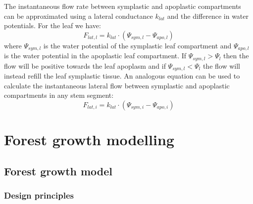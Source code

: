 \documentclass[]{book}
\begin{document}
The instantaneous flow rate between symplastic and apoplastic compartments can be approximated using a lateral conductance \(k_{lat}\) and the difference in water potentials. For the leaf we have:
\begin{equation}
F_{lat, l} = k_{lat} \cdot (\Psi_{sym, l} - \Psi_{apo,l})
\end{equation}
where \(\Psi_{sym, l}\) is the water potential of the symplastic leaf compartment and \(\Psi_{apo,l}\) is the water potential in the apoplastic leaf compartment. If \(\Psi_{sym, l} > \Psi_l\) then the flow will be positive towards the leaf apoplasm and if \(\Psi_{sym, l} < \Psi_l\) the flow will instead refill the leaf symplastic tissue. An analogous equation can be used to calculate the instantaneous lateral flow between symplastic and apoplastic compartments in any stem segment:
\begin{equation}
F_{lat, i} = k_{lat} \cdot (\Psi_{sym, i} - \Psi_{apo, i})
\end{equation}

\hypertarget{part-forest-growth-modelling}{%
\part{Forest growth modelling}\label{part-forest-growth-modelling}}

\hypertarget{forest-growth-model}{%
\chapter{Forest growth model}\label{forest-growth-model}}

\hypertarget{design-principles-2}{%
\section{Design principles}\label{design-principles-2}}
\end{document}
